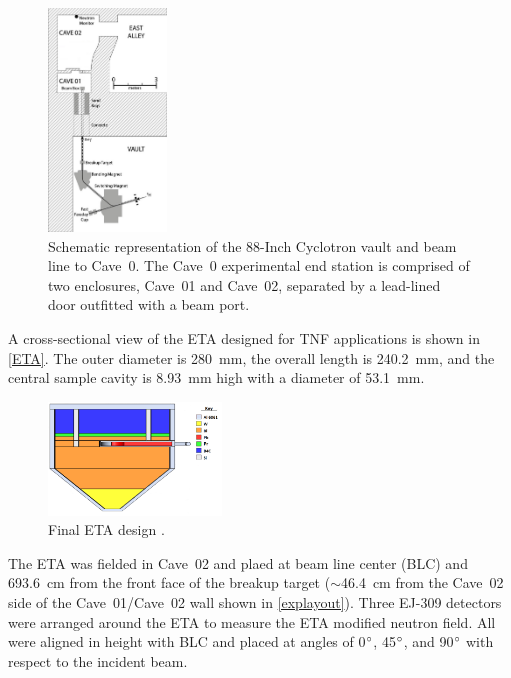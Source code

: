 \documentclass[twocolumn,10pt,final]{asme2ej}
\begin{document}
\vspace{-0.4 cm}
\begin{figure} [htp!]
\centering
\includegraphics[width=0.28\textwidth]{../figs/vault_scaled.eps}
\caption{Schematic representation of the 88-Inch Cyclotron vault and beam line to Cave~0. The Cave~0 experimental end station is comprised of two enclosures, Cave~01 and Cave~02, separated by a lead-lined door outfitted with a beam port.}
\label{explayout}
\vspace{-0.4 cm}
\end{figure}

A cross-sectional view of the ETA designed for TNF applications is shown in \autoref{ETA}.
The outer diameter is 280~mm, the overall length is 240.2~mm, and the central sample cavity is 8.93~mm high with a diameter of 53.1~mm.

\begin{figure} [htp!]
 \centering
 \includegraphics[trim = 0cm 0cm 0cm 0cm, clip, width=0.41\textwidth]{../Figs/ETA.png}
   \caption{Final ETA design \cite{Bevins2017}.}
     \label{ETA}
\vspace{-0.4 cm}
\end{figure}


The ETA was fielded in Cave~02 and plaed at beam line center (BLC) and 693.6~cm from the front face of the breakup target ($\sim$46.4~cm from the Cave~02 side of the Cave~01/Cave~02 wall shown in \autoref{explayout}).
Three EJ-309 detectors were arranged around the ETA to measure the ETA modified neutron field.
All were aligned in height with BLC and placed at angles of 0$\degree$, 45$\degree$, and 90$\degree$ with respect to the incident beam.  
\end{document}
